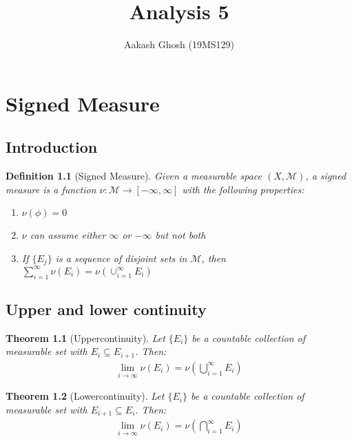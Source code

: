 \documentclass[notoc]{tufte-book}
\title{{Analysis 5} }
\author[Aakash Ghosh]{Aakash Ghosh (19MS129)}
\newtheorem{defn}{Definition}
\newtheorem{theorem}{Theorem}
\begin{document}
\maketitle




\tableofcontents


\chapter{Signed Measure}
\section{Introduction}
\begin{defn}[Signed Measure]
	Given a measurable space $(X,\mathcal{M})$, a signed measure is a function $\nu:\mathcal{M}\to[-\infty,\infty]$ with the following properties:
\begin{enumerate}
	\item $\nu(\phi)=0$
	\item $\nu$ can assume either $\infty$ or $-\infty$ but not both 
	\item If $\{E_j\}$ is a sequence of disjoint sets in $\mathcal{M}$, then $\sum_{i=1}^\infty \nu(E_i)=\nu\left(\cup_{i=1}^\infty E_i \right)$
\end{enumerate}
\end{defn}
\section{Upper and lower continuity}

\begin{theorem}[Uppercontinuity]
	Let $\{E_i\}$ be a countable collection of measurable set with $E_i\subseteq E_{i+1}$. Then:
	\begin{align}
		\lim_{i\to\infty}\nu(E_i)=\nu\left(\bigcup_{i=1}^\infty E_i\right)
	\end{align}
\end{theorem}

\begin{theorem}[Lowercontinuity]
	Let $\{E_i\}$ be a countable collection of measurable set with $E_{i+1}\subseteq E_{i}$. Then:
	\begin{align}
		\lim_{i\to\infty}\nu(E_i)=\nu\left(\bigcap_{i=1}^\infty E_i\right)
	\end{align}
\end{theorem}
\end{document}
